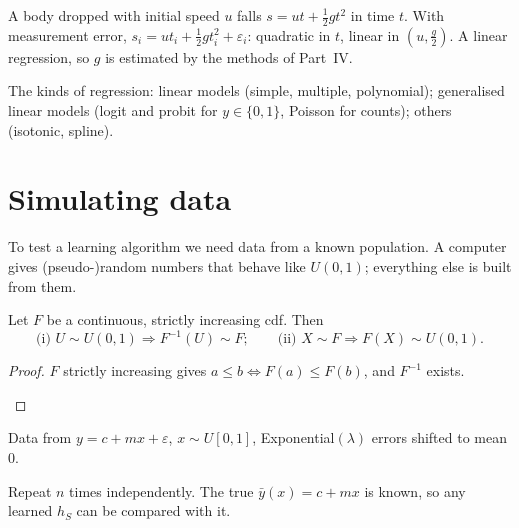 \begin{example}
A body dropped with initial speed $u$ falls $s=ut+\frac12gt^2$ in time $t$. With measurement error, $s_i=ut_i+\frac12gt_i^2+\varepsilon_i$: quadratic in $t$, linear in $(u,\frac g2)$. A linear regression, so $g$ is estimated by the methods of Part~IV.
\end{example}

The kinds of regression: linear models (simple, multiple, polynomial); generalised linear models (logit and probit for $y\in\{0,1\}$, Poisson for counts); others (isotonic, spline).

\section{Simulating data}

To test a learning algorithm we need data from a known population. A computer gives (pseudo-)random numbers that behave like $U(0,1)$; everything else is built from them.

\begin{theorem}
Let $F$ be a continuous, strictly increasing cdf. Then
\[
  \boxed{\;\text{(i) }U\sim U(0,1)\Rightarrow F^{-1}(U)\sim F;\qquad\text{(ii) }X\sim F\Rightarrow F(X)\sim U(0,1).\;}
\]
\end{theorem}
\begin{proof}
$F$ strictly increasing gives $a\le b\iff F(a)\le F(b)$, and $F^{-1}$ exists.
\begin{deriv}
\end{deriv}
\end{proof}

\begin{example}
Data from $y=c+mx+\varepsilon$, $x\sim U[0,1]$, Exponential$(\lambda)$ errors shifted to mean $0$.
\begin{deriv}
\end{deriv}
Repeat $n$ times independently. The true $\bar y(x)=c+mx$ is known, so any learned $h_S$ can be compared with it.
\end{example}

